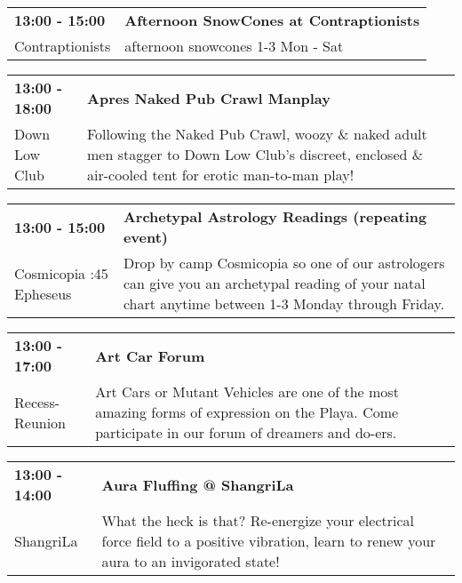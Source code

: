 \begin{tabular}{ p{1in} p{2.2in} }
    \textbf{13:00 - 15:00} & \textbf{Afternoon SnowCones at Contraptionists} \\
    Contraptionists \newline  & afternoon snowcones 1-3 Mon - Sat \\
    \hline 
\end{tabular}
    
\begin{tabular}{ p{1in} p{2.2in} }
    \textbf{13:00 - 18:00} & \textbf{Apres Naked Pub Crawl Manplay} \\
    Down Low Club \newline  & Following the Naked Pub Crawl, woozy \& naked adult men stagger to Down Low Club's discreet, enclosed \& air-cooled tent for erotic man-to-man play! \\
    \hline 
\end{tabular}
    
\begin{tabular}{ p{1in} p{2.2in} }
    \textbf{13:00 - 15:00} & \textbf{Archetypal Astrology Readings (repeating event)} \\
    Cosmicopia \newline 3:45 Epheseus & Drop by camp Cosmicopia so one of our astrologers can give you an archetypal reading of your natal chart anytime between 1-3 Monday through Friday. \\
    \hline 
\end{tabular}
    
\begin{tabular}{ p{1in} p{2.2in} }
    \textbf{13:00 - 17:00} & \textbf{Art Car Forum} \\
    Recess-Reunion \newline  & Art Cars or Mutant Vehicles are one of the most amazing forms of expression on the Playa.  Come participate in our forum of dreamers and do-ers. \\
    \hline 
\end{tabular}
    
\begin{tabular}{ p{1in} p{2.2in} }
    \textbf{13:00 - 14:00} & \textbf{Aura Fluffing @ ShangriLa} \\
    ShangriLa \newline  & What the heck is that? Re-energize your electrical force field to a positive vibration, learn to renew your aura to an invigorated state! \\
    \hline 
\end{tabular}
    
